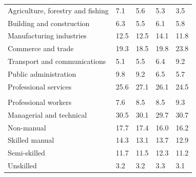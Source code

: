 \documentclass{article}
\begin{document}
\begin{table}[h]
\begin{tabular}{KTTTT}
    \hline
Agriculture, forestry and fishing  & 7.1& 5.6& 5.3& 3.5\\
Building and construction & 6.3& 5.5& 6.1& 5.8\\
Manufacturing industries & 12.5& 12.5& 14.1& 11.8\\
Commerce and trade  & 19.3& 18.5& 19.8& 23.8\\
Transport and communications  & 5.1& 5.5& 6.4& 9.2\\
Public administration & 9.8& 9.2& 6.5& 5.7\\
Professional services & 25.6& 27.1& 26.1& 24.5\\
\hline
    \\ 
    \hline
Professional workers  & 7.6& 8.5 & 8.5& 9.3\\
Managerial and technical & 30.5& 30.1& 29.7& 30.7\\
Non-manual & 17.7& 17.4& 16.0& 16.2\\
Skilled manual & 14.3& 13.1& 13.7& 12.9\\
Semi-skilled & 11.7& 11.5& 12.3& 11.2\\
Unskilled  & 3.2& 3.2& 3.3& 3.1\\
\end{tabular}
\end{table}
\pagebreak
\end{document}
